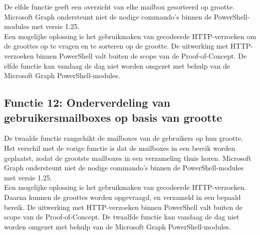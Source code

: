 De elfde functie geeft een overzicht van elke mailbox gesorteerd op grootte. Microsoft Graph ondersteunt niet de nodige commando's binnen de PowerShell-modules met versie 1.25. \\ 

Een mogelijke oplossing is het gebruikmaken van gecodeerde \ac{HTTP}-verzoeken om de groottes op te vragen en te sorteren op de grootte. De uitwerking met \ac{HTTP}-verzoeken binnen PowerShell valt buiten de scope van de Proof-of-Concept. De elfde functie kan vandaag de dag niet worden omgezet met behulp van de Microsoft Graph PowerShell-modules.

\subsection{Functie 12: Onderverdeling van gebruikersmailboxes op basis van grootte}

De twaalde functie rangschikt de mailboxes van de gebruikers op hun grootte. Het verschil met de vorige functie is dat de mailboxes in een bereik worden geplaatst, zodat de grootste mailboxes in een verzameling thuis horen. Microsoft Graph ondersteunt niet de nodige commando's binnen de PowerShell-modules met versie 1.25. \\ 

Een mogelijke oplossing is het gebruikmaken van gecodeerde \ac{HTTP}-verzoeken. Daarna kunnen de groottes worden opgevraagd, en verzameld in een bepaald bereik. De uitwerking met \ac{HTTP}-verzoeken binnen PowerShell valt buiten de scope van de Proof-of-Concept. De twaalfde functie kan vandaag de dag niet worden omgezet met behulp van de Microsoft Graph PowerShell-modules.

